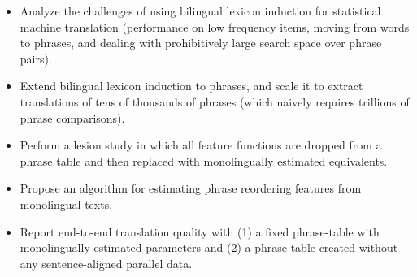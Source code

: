 \documentclass[11pt]{article}
\newcommand{\mtodo}[1]{}
\newcommand{\todop}[2]{\noindent\textcolor{red}{TODO for #1:} #2\\}
\newcommand{\secref}[1]{Section~\ref{#1}}
\begin{document}


\begin{itemize}
  \item Analyze the challenges of using bilingual lexicon induction for statistical machine translation (performance on low frequency items, moving from words to phrases, and dealing with prohibitively large search space over phrase pairs).
  \item Extend bilingual lexicon induction to phrases, and scale it to extract translations of tens of thousands of  phrases (which naively requires trillions of phrase comparisons). 
  \item Perform a lesion study in which all feature functions are dropped from a phrase table and then replaced with monolingually estimated equivalents.
  \item Propose an algorithm for estimating phrase reordering features from monolingual texts.
  \item Report end-to-end translation quality with (1) a fixed phrase-table with monolingually estimated parameters and (2) a phrase-table created without any sentence-aligned parallel data.
\end{itemize}
\end{document}
